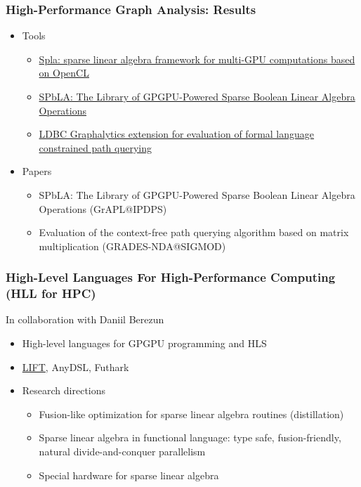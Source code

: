 \documentclass[xcolor=table,aspectratio=169]{beamer}
\begin{document}
\begin{frame}[fragile]
  \frametitle{High-Performance Graph Analysis: Results}
    \begin{itemize}
      \item Tools
      \begin{itemize}
        \item \href{https://github.com/JetBrains-Research/spla}{Spla: sparse linear algebra framework for multi-GPU computations based on OpenCL}
        \item \href{https://ieeexplore.ieee.org/abstract/document/9460674}{SPbLA: The Library of GPGPU-Powered Sparse Boolean Linear Algebra Operations}    
        \item \href{https://github.com/JetBrains-Research/ldbc_graphalytics}{LDBC Graphalytics extension for evaluation of formal language constrained path querying}    
      \end{itemize}
      \item Papers 
      \begin{itemize}
        \item SPbLA: The Library of GPGPU-Powered Sparse Boolean Linear Algebra Operations (GrAPL@IPDPS)
        \item Evaluation of the context-free path querying algorithm based on matrix multiplication (GRADES-NDA@SIGMOD)
      \end{itemize} 
    \end{itemize}
\end{frame}

\begin{frame}[fragile]
  \frametitle{High-Level Languages For High-Performance Computing (HLL for HPC)}
  In collaboration with Daniil Berezun
  \begin{itemize}    
  \item High-level languages for GPGPU programming and HLS
  \item \href{https://www.lift-project.org/}{LIFT}, AnyDSL, Futhark
  \item Research directions
  \begin{itemize}
    \item Fusion-like optimization for sparse linear algebra routines (distillation)
    \item Sparse linear algebra in functional language: type safe, fusion-friendly, natural divide-and-conquer parallelism
    \item Special hardware for sparse linear algebra
  \end{itemize}
  \end{itemize}
\end{frame}
\end{document}
